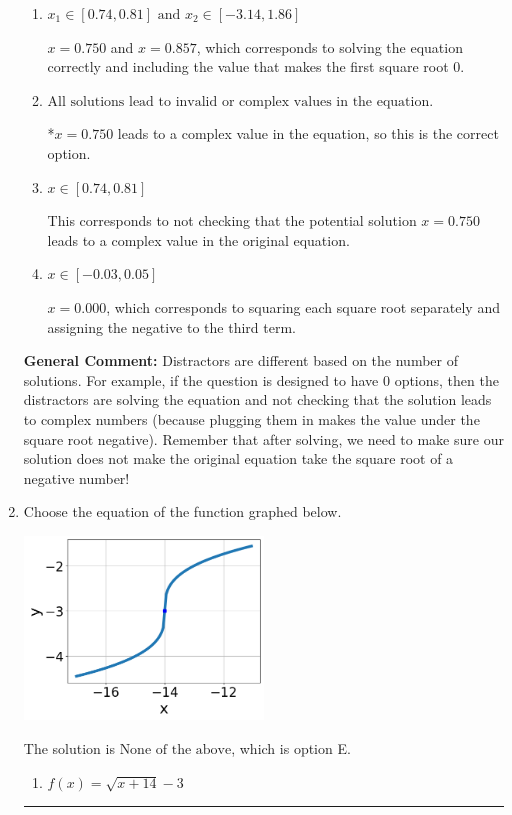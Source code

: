 \documentclass{extbook}[14pt]
\newcommand{\litem}[1]{\item #1

\rule{\textwidth}{0.4pt}}
\begin{document}
\begin{enumerate}
{\begin{enumerate}[label=\Alph*.]
$x = 0.667$ and $x = 0.857$, which corresponds to solving each radical separately for 0.
\item \( x_1 \in [0.74, 0.81] \text{ and } x_2 \in [-3.14,1.86] \)

$x = 0.750$ and $x = 0.857$, which corresponds to solving the equation correctly and including the value that makes the first square root 0.
\item \( \text{All solutions lead to invalid or complex values in the equation.} \)

*$x = 0.750$ leads to a complex value in the equation, so this is the correct option.
\item \( x \in [0.74,0.81] \)

This corresponds to not checking that the potential solution $x = 0.750$ leads to a complex value in the original equation.
\item \( x \in [-0.03,0.05] \)

$x = 0.000$, which corresponds to squaring each square root separately and assigning the negative to the third term.
\end{enumerate}

\textbf{General Comment:} Distractors are different based on the number of solutions. For example, if the question is designed to have 0 options, then the distractors are solving the equation and not checking that the solution leads to complex numbers (because plugging them in makes the value under the square root negative). Remember that after solving, we need to make sure our solution does not make the original equation take the square root of a negative number!
}
\litem{
Choose the equation of the function graphed below.

\begin{center}
    \includegraphics[width=0.5\textwidth]{../Figures/radicalGraphToEquationCopyC.png}
\end{center}




The solution is \( \text{None of the above} \), which is option E.\begin{enumerate}[label=\Alph*.]
\item \( f(x) = \sqrt{x + 14} - 3 \)


\end{enumerate}}
\end{enumerate}
\end{document}
